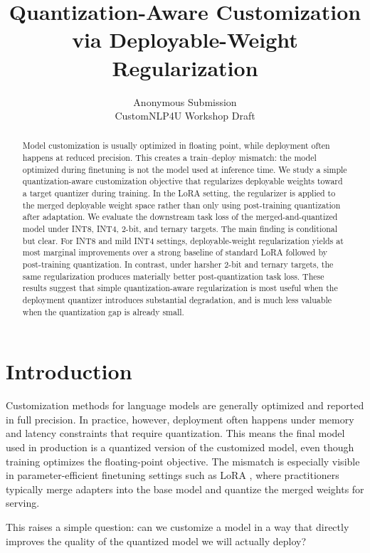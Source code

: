 \documentclass[11pt]{article}
\title{Quantization-Aware Customization via Deployable-Weight Regularization}
\author{
  Anonymous Submission \\
  CustomNLP4U Workshop Draft \\
}
\begin{document}
\maketitle

\begin{abstract}
Model customization is usually optimized in floating point, while deployment often happens at reduced precision. This creates a train--deploy mismatch: the model optimized during finetuning is not the model used at inference time. We study a simple quantization-aware customization objective that regularizes deployable weights toward a target quantizer during training. In the LoRA setting, the regularizer is applied to the merged deployable weight space rather than only using post-training quantization after adaptation. We evaluate the downstream task loss of the merged-and-quantized model under INT8, INT4, 2-bit, and ternary targets. The main finding is conditional but clear. For INT8 and mild INT4 settings, deployable-weight regularization yields at most marginal improvements over a strong baseline of standard LoRA followed by post-training quantization. In contrast, under harsher 2-bit and ternary targets, the same regularization produces materially better post-quantization task loss. These results suggest that simple quantization-aware regularization is most useful when the deployment quantizer introduces substantial degradation, and is much less valuable when the quantization gap is already small.
\end{abstract}

\section{Introduction}

Customization methods for language models are generally optimized and reported in full precision. In practice, however, deployment often happens under memory and latency constraints that require quantization. This means the final model used in production is a quantized version of the customized model, even though training optimizes the floating-point objective. The mismatch is especially visible in parameter-efficient finetuning settings such as LoRA \citep{hu2022lora}, where practitioners typically merge adapters into the base model and quantize the merged weights for serving.

This raises a simple question: can we customize a model in a way that directly improves the quality of the quantized model we will actually deploy?
\end{document}
